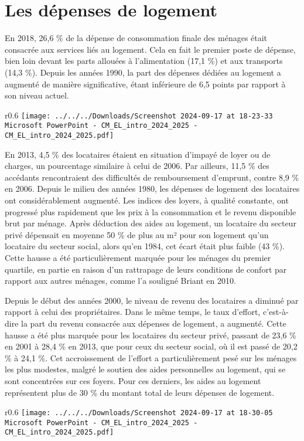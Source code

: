 \documentclass[a4paper, 12pt]{report}
\begin{document}
\section{Les dépenses de logement}

En 2018, 26,6 \% de la dépense de consommation finale des ménages était consacrée aux services liés au logement. Cela en fait le premier poste de dépense, bien loin devant les parts allouées à l'alimentation (17,1 \%) et aux transports (14,3 \%). Depuis les années 1990, la part des dépenses dédiées au logement a augmenté de manière significative, étant inférieure de 6,5 points par rapport à son niveau actuel.

\begin{wrapfigure}{r}{0.6\textwidth}
	\centering
\texttt{[image: ../../../Downloads/Screenshot 2024-09-17 at 18-23-33 Microsoft PowerPoint - CM\_EL\_intro\_2024\_2025 - CM\_EL\_intro\_2024\_2025.pdf]}
\end{wrapfigure}

En 2013, 4,5 \% des locataires étaient en situation d'impayé de loyer ou de charges, un pourcentage similaire à celui de 2006. Par ailleurs, 11,5 \% des accédants rencontraient des difficultés de remboursement d'emprunt, contre 8,9 \% en 2006. Depuis le milieu des années 1980, les dépenses de logement des locataires ont considérablement augmenté. Les indices des loyers, à qualité constante, ont progressé plus rapidement que les prix à la consommation et le revenu disponible brut par ménage. Après déduction des aides au logement, un locataire du secteur privé dépensait en moyenne 50 \% de plus au m² pour son logement qu’un locataire du secteur social, alors qu’en 1984, cet écart était plus faible (43 \%). Cette hausse a été particulièrement marquée pour les ménages du premier quartile, en partie en raison d'un rattrapage de leurs conditions de confort par rapport aux autres ménages, comme l’a souligné Briant en 2010.

Depuis le début des années 2000, le niveau de revenu des locataires a diminué par rapport à celui des propriétaires. Dans le même temps, le taux d’effort, c’est-à-dire la part du revenu consacrée aux dépenses de logement, a augmenté. Cette hausse a été plus marquée pour les locataires du secteur privé, passant de 23,6 \% en 2001 à 28,4 \% en 2013, que pour ceux du secteur social, où il est passé de 20,2 \% à 24,1 \%. Cet accroissement de l'effort a particulièrement pesé sur les ménages les plus modestes, malgré le soutien des aides personnelles au logement, qui se sont concentrées sur ces foyers. Pour ces derniers, les aides au logement représentent plus de 30 \% du montant total de leurs dépenses de logement.
\newpage
\begin{wrapfigure}{r}{0.6\textwidth}
	\centering
\texttt{[image: ../../../Downloads/Screenshot 2024-09-17 at 18-30-05 Microsoft PowerPoint - CM\_EL\_intro\_2024\_2025 - CM\_EL\_intro\_2024\_2025.pdf]}
\end{wrapfigure}
\end{document}
